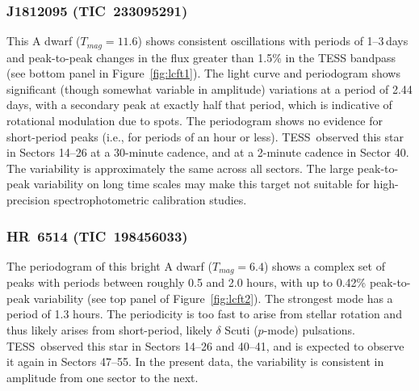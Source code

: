 \documentclass[twocolumn]{aastex631}
\newcommand{\webb}{JWST}
\newcommand{\tess}{TESS}
\begin{document}
\subsubsection{J1812095 (TIC~233095291)}

This A dwarf ($T_{mag}=11.6$) shows consistent oscillations with periods of 1--3\,days and peak-to-peak changes in the flux greater than 1.5\% in the TESS bandpass (see bottom panel in Figure~\ref{fig:lcft1}).  The light curve and periodogram shows significant (though somewhat variable in amplitude) variations at a period of 2.44 days, with a secondary peak at exactly half that period, which is indicative of rotational modulation due to spots.  The periodogram shows no evidence for short-period peaks (i.e., for periods of an hour or less).  \tess\ observed this star in Sectors 14--26 at a 30-minute cadence, and at a 2-minute cadence in Sector 40.  The variability is approximately the same across all sectors. The large peak-to-peak variability on long time scales may make this target not suitable for high-precision spectrophotometric calibration studies.



\subsubsection{HR~6514 (TIC~198456033)} %

The periodogram of this bright A dwarf ($T_{mag}=6.4$) shows a complex set of peaks with periods between roughly 0.5 and 2.0 hours, with up to 0.42\% peak-to-peak variability (see top panel of Figure~\ref{fig:lcft2}).  The strongest mode has a period of 1.3 hours.  The periodicity is too fast to arise from stellar rotation and thus likely arises from short-period, likely $\delta$ Scuti ($p$-mode) pulsations.  \tess\ observed this star in Sectors 14--26 and 40--41, and is expected to observe it again in Sectors 47--55.  In the present data, the variability is consistent in amplitude from one sector to the next. 

\end{document}
